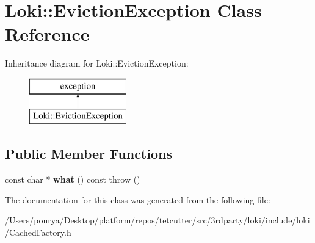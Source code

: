 \hypertarget{classLoki_1_1EvictionException}{}\section{Loki\+:\+:Eviction\+Exception Class Reference}
\label{classLoki_1_1EvictionException}
Inheritance diagram for Loki\+:\+:Eviction\+Exception\+:\begin{figure}[H]
\begin{center}
\leavevmode
\includegraphics[height=2.000000cm]{classLoki_1_1EvictionException}
\end{center}
\end{figure}
\subsection*{Public Member Functions}
\begin{DoxyCompactItemize}
\item 
\hypertarget{classLoki_1_1EvictionException_a1bb3f5528a3b36db01ed1f777247660a}{}const char $\ast$ {\bfseries what} () const   throw ()\label{classLoki_1_1EvictionException_a1bb3f5528a3b36db01ed1f777247660a}

\end{DoxyCompactItemize}


The documentation for this class was generated from the following file\+:\begin{DoxyCompactItemize}
\item 
/\+Users/pourya/\+Desktop/platform/repos/tetcutter/src/3rdparty/loki/include/loki/Cached\+Factory.\+h\end{DoxyCompactItemize}
